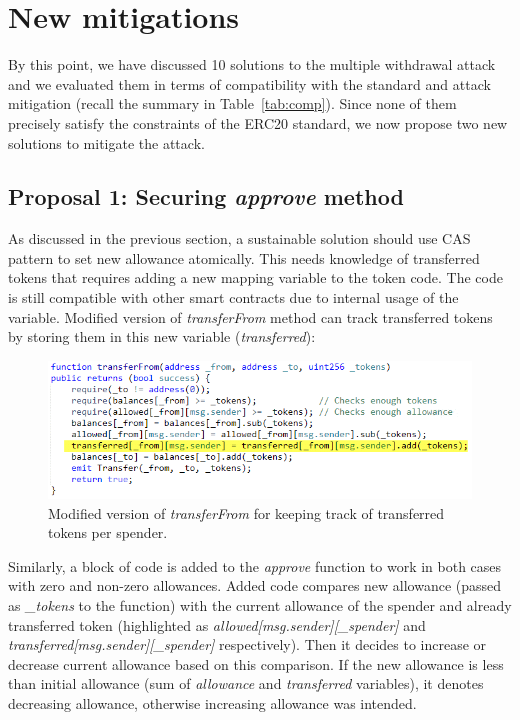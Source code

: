 
\section{New mitigations}

By this point, we have discussed 10 solutions to the multiple withdrawal attack and we evaluated them in terms of compatibility with the standard and attack mitigation (recall the summary in Table~\ref{tab:comp}). Since none of them precisely satisfy the constraints of the ERC20 standard, we now propose two new solutions to mitigate the attack.

\subsection{Proposal 1: Securing \textit{approve} method}

As discussed in the previous section, a sustainable solution should use CAS pattern\cite{Ref06} to set new allowance atomically. This needs knowledge of transferred tokens that requires adding a new mapping variable to the token code. The code is still compatible with other smart contracts due to internal usage of the variable. Modified version of \textit{transferFrom} method can track transferred tokens by storing them in this new variable (\textit{transferred}):

\begin{figure}[t]
	\centering
	\includegraphics[width=1.0\linewidth]{figures/multiple_withdrawal_14.png}
	\caption{Modified version of \textit{transferFrom} for keeping track of transferred tokens per spender.}
\end{figure}

Similarly, a block of code is added to the \textit{approve} function to work in both cases with zero and non-zero allowances. Added code compares new allowance (passed as \textit{\_tokens} to the function) with the current allowance of the spender and already transferred token (highlighted as \textit{allowed[msg.sender][\_spender]} and \textit{transferred[msg.sender][\_spender]} respectively). Then it decides to increase or decrease current allowance based on this comparison. If the new allowance is less than initial allowance (sum of \textit{allowance} and \textit{transferred} variables), it denotes decreasing allowance, otherwise increasing allowance was intended.

